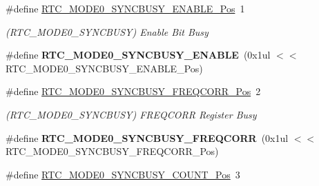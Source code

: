 \begin{DoxyCompactItemize}
\item 
\hypertarget{group___s_a_m_l21___r_t_c_gaf00db037e04c0f462edc5f519f526d8e}{}\#define \hyperlink{group___s_a_m_l21___r_t_c_gaf00db037e04c0f462edc5f519f526d8e}{R\+T\+C\+\_\+\+M\+O\+D\+E0\+\_\+\+S\+Y\+N\+C\+B\+U\+S\+Y\+\_\+\+E\+N\+A\+B\+L\+E\+\_\+\+Pos}~1\label{group___s_a_m_l21___r_t_c_gaf00db037e04c0f462edc5f519f526d8e}

\begin{DoxyCompactList}\small\item\em (R\+T\+C\+\_\+\+M\+O\+D\+E0\+\_\+\+S\+Y\+N\+C\+B\+U\+S\+Y) Enable Bit Busy \end{DoxyCompactList}\item 
\hypertarget{group___s_a_m_l21___r_t_c_ga6bd0f6938ca77fa8d7cfca32770fdc18}{}\#define {\bfseries R\+T\+C\+\_\+\+M\+O\+D\+E0\+\_\+\+S\+Y\+N\+C\+B\+U\+S\+Y\+\_\+\+E\+N\+A\+B\+L\+E}~(0x1ul $<$$<$ R\+T\+C\+\_\+\+M\+O\+D\+E0\+\_\+\+S\+Y\+N\+C\+B\+U\+S\+Y\+\_\+\+E\+N\+A\+B\+L\+E\+\_\+\+Pos)\label{group___s_a_m_l21___r_t_c_ga6bd0f6938ca77fa8d7cfca32770fdc18}

\item 
\hypertarget{group___s_a_m_l21___r_t_c_ga4f6fc9f1897b7df31378c38198f79d9e}{}\#define \hyperlink{group___s_a_m_l21___r_t_c_ga4f6fc9f1897b7df31378c38198f79d9e}{R\+T\+C\+\_\+\+M\+O\+D\+E0\+\_\+\+S\+Y\+N\+C\+B\+U\+S\+Y\+\_\+\+F\+R\+E\+Q\+C\+O\+R\+R\+\_\+\+Pos}~2\label{group___s_a_m_l21___r_t_c_ga4f6fc9f1897b7df31378c38198f79d9e}

\begin{DoxyCompactList}\small\item\em (R\+T\+C\+\_\+\+M\+O\+D\+E0\+\_\+\+S\+Y\+N\+C\+B\+U\+S\+Y) F\+R\+E\+Q\+C\+O\+R\+R Register Busy \end{DoxyCompactList}\item 
\hypertarget{group___s_a_m_l21___r_t_c_gaca45a4faa6aa7e70f64f4a7caa17372f}{}\#define {\bfseries R\+T\+C\+\_\+\+M\+O\+D\+E0\+\_\+\+S\+Y\+N\+C\+B\+U\+S\+Y\+\_\+\+F\+R\+E\+Q\+C\+O\+R\+R}~(0x1ul $<$$<$ R\+T\+C\+\_\+\+M\+O\+D\+E0\+\_\+\+S\+Y\+N\+C\+B\+U\+S\+Y\+\_\+\+F\+R\+E\+Q\+C\+O\+R\+R\+\_\+\+Pos)\label{group___s_a_m_l21___r_t_c_gaca45a4faa6aa7e70f64f4a7caa17372f}

\item 
\hypertarget{group___s_a_m_l21___r_t_c_ga33b891d623f18db79d1b091e35a69575}{}\#define \hyperlink{group___s_a_m_l21___r_t_c_ga33b891d623f18db79d1b091e35a69575}{R\+T\+C\+\_\+\+M\+O\+D\+E0\+\_\+\+S\+Y\+N\+C\+B\+U\+S\+Y\+\_\+\+C\+O\+U\+N\+T\+\_\+\+Pos}~3\label{group___s_a_m_l21___r_t_c_ga33b891d623f18db79d1b091e35a69575}


\end{DoxyCompactItemize}
